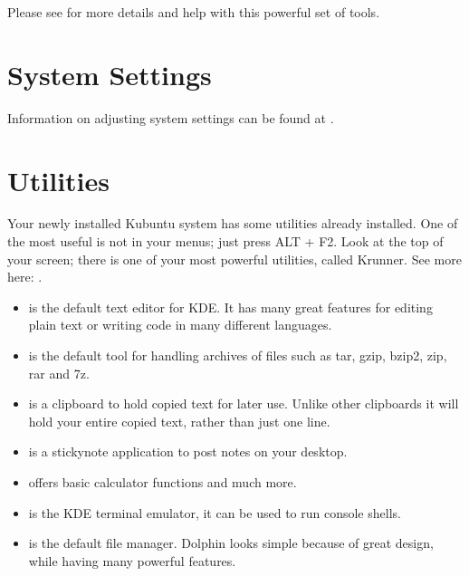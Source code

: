 \documentclass[letterpaper,10pt,english]{sphinxmanual}
\begin{document}
\sphinxAtStartPar
Please see  for more details and help with this powerful set of tools.


\section{System Settings}
\label{\detokenize{docs/software:system-settings}}
\sphinxAtStartPar
Information on adjusting system settings can be found at .


\section{Utilities}
\label{\detokenize{docs/software:utilities}}
\sphinxAtStartPar
Your newly installed Kubuntu system has some utilities already installed. One of the most useful is not in your menus; just press ALT + F2. Look at the top of your screen; there is one of your most powerful utilities, called Krunner. See more here: .
\begin{itemize}
\item {} 
\sphinxAtStartPar
{} is the default text editor for KDE. It has many great features for editing plain text or writing code in many different languages.

\item {} 
\sphinxAtStartPar
{} is the default tool for handling archives of files such as tar, gzip, bzip2, zip, rar and 7z.

\item {} 
\sphinxAtStartPar
{} is a clipboard to hold copied text for later use. Unlike other clipboards it will hold your entire copied text, rather than just one line.

\item {} 
\sphinxAtStartPar
{} is a sticky\sphinxhyphen{}note application to post notes on your desktop.

\item {} 
\sphinxAtStartPar
{} offers basic calculator functions and much more.

\item {} 
\sphinxAtStartPar
{} is the KDE terminal emulator, it can be used to run console shells.

\item {} 
\sphinxAtStartPar
{} is the default file manager. Dolphin looks simple because of great design, while having many powerful features.

\end{itemize}
\end{document}
